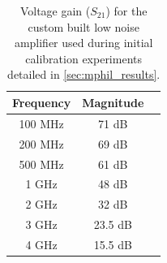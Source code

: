 \begin{table}
    \centering
    \begin{tabular}{ |c|c|c| }
        \hline
        Frequency & Magnitude \\
        \hline 
        100 MHz & 71 dB \\
        200 MHz & 69 dB \\
        500 MHz & 61 dB \\
        1 GHz & 48 dB \\
        2 GHz & 32 dB \\
        3 GHz & 23.5 dB \\
        4 GHz & 15.5 dB \\
        \hline 
    \end{tabular}
    \caption{Voltage gain ($S_{21}$) for the custom built low noise amplifier used during initial calibration experiments detailed in \cref{sec:mphil_results}.}
    \label{tab:mphil_lna}
\end{table}